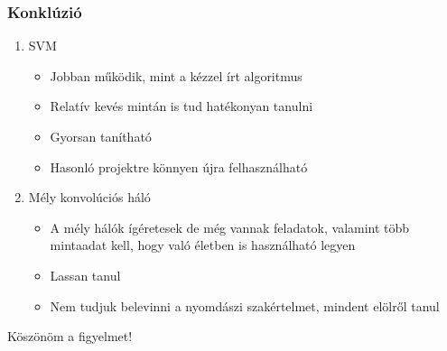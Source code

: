 \documentclass[11pt]{beamer}
\begin{document}
\begin{frame}
	\frametitle{Konklúzió}

	\begin{enumerate}
	\item SVM
		\begin{itemize}
			\item 
			Jobban működik, mint a kézzel írt algoritmus
			\item 
			Relatív kevés mintán is tud hatékonyan tanulni
			\item 
			Gyorsan tanítható
			\item
			Hasonló projektre könnyen újra felhasználható
		\end{itemize}
	
	\item
		Mély konvolúciós háló
		\begin{itemize}
		\item 
			A mély hálók ígéretesek de még vannak feladatok, valamint több mintaadat kell, hogy való életben is használható legyen
		\item 
			Lassan tanul
		\item
			Nem tudjuk belevinni a nyomdászi szakértelmet, mindent elölről tanul
		\end{itemize}
	\end{enumerate}


%	
%	
%	


\end{frame}



\begin{frame}

	\centering
	Köszönöm a figyelmet!

\end{frame}
\end{document}
